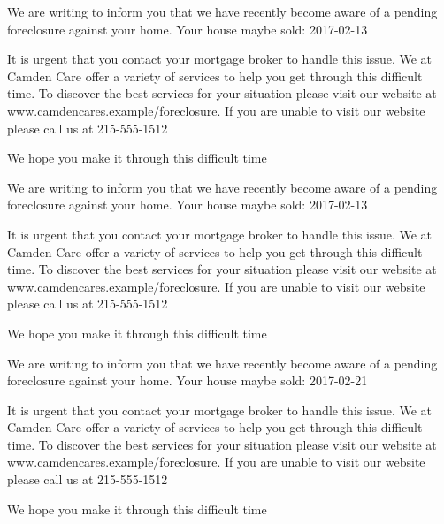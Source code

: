 \documentclass[10pt,stdletter]{newlfm}
\begin{document}
\pagebreak
{}
\begin{newlfm}

We are writing to inform you that we have recently become aware of a pending foreclosure against your home. Your house maybe sold: 2017-02-13

It is urgent that you contact your mortgage broker to handle this issue.
We at Camden Care offer a variety of services to help you get through this difficult time. To discover the best services for your situation please visit our website at www.camdencares.example/foreclosure.
If you are unable to visit our website please call us at 215-555-1512

We hope you make it through this difficult time

\end{newlfm}
\pagebreak
{}
\begin{newlfm}

We are writing to inform you that we have recently become aware of a pending foreclosure against your home. Your house maybe sold: 2017-02-13

It is urgent that you contact your mortgage broker to handle this issue.
We at Camden Care offer a variety of services to help you get through this difficult time. To discover the best services for your situation please visit our website at www.camdencares.example/foreclosure.
If you are unable to visit our website please call us at 215-555-1512

We hope you make it through this difficult time

\end{newlfm}
\pagebreak
{}
\begin{newlfm}

We are writing to inform you that we have recently become aware of a pending foreclosure against your home. Your house maybe sold: 2017-02-21

It is urgent that you contact your mortgage broker to handle this issue.
We at Camden Care offer a variety of services to help you get through this difficult time. To discover the best services for your situation please visit our website at www.camdencares.example/foreclosure.
If you are unable to visit our website please call us at 215-555-1512

We hope you make it through this difficult time

\end{newlfm}
\end{document}
